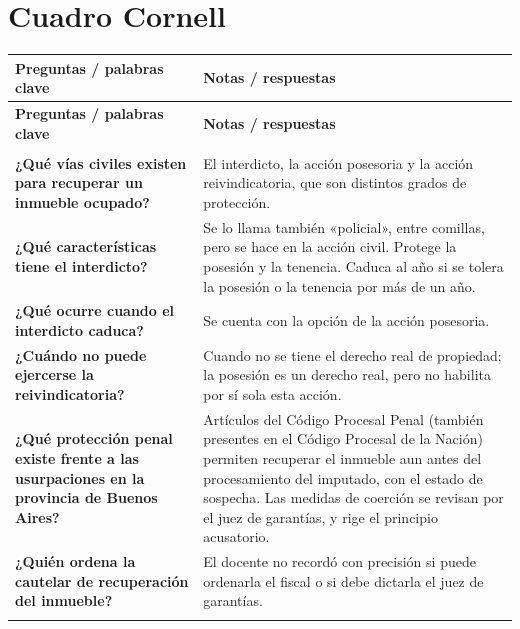 \documentclass[12pt,oneside]{book}
\newlength{\cornellizq}
\newlength{\cornellder}
\newenvironment{cornell}
{\begin{longtable}{>{\columncolor{gray!10}\raggedright\arraybackslash}p{\cornellizq}>{\raggedright\arraybackslash}p{\cornellder}}
\toprule
\textbf{Preguntas / palabras clave} & \textbf{Notas / respuestas} \\
\midrule
\endfirsthead
\toprule
\textbf{Preguntas / palabras clave} & \textbf{Notas / respuestas} \\
\midrule
\endhead
\midrule
\multicolumn{2}{r}{\footnotesize\itshape Continúa en la página siguiente} \\
\endfoot
\endlastfoot}
{\end{longtable}}
\begin{document}
\section{Cuadro Cornell}

\begin{cornell}
\textbf{¿Qué vías civiles existen para recuperar un inmueble ocupado?} &
El interdicto, la acción posesoria y la acción reivindicatoria, que son distintos grados de protección. \\
\addlinespace
\midrule[0.3pt]
\textbf{¿Qué características tiene el interdicto?} &
Se lo llama también «policial», entre comillas, pero se hace en la acción civil. Protege la posesión y la tenencia. Caduca al año si se tolera la posesión o la tenencia por más de un año. \\
\addlinespace
\midrule[0.3pt]
\textbf{¿Qué ocurre cuando el interdicto caduca?} &
Se cuenta con la opción de la acción posesoria. \\
\addlinespace
\midrule[0.3pt]
\textbf{¿Cuándo no puede ejercerse la reivindicatoria?} &
Cuando no se tiene el derecho real de propiedad; la posesión es un derecho real, pero no habilita por sí sola esta acción. \\
\addlinespace
\midrule[0.3pt]
\textbf{¿Qué protección penal existe frente a las usurpaciones en la provincia de Buenos Aires?} &
Artículos del Código Procesal Penal (también presentes en el Código Procesal de la Nación) permiten recuperar el inmueble aun antes del procesamiento del imputado, con el estado de sospecha. Las medidas de coerción se revisan por el juez de garantías, y rige el principio acusatorio. \\
\addlinespace
\midrule[0.3pt]
\textbf{¿Quién ordena la cautelar de recuperación del inmueble?} &
El docente no recordó con precisión si puede ordenarla el fiscal o si debe dictarla el juez de garantías. \\
\addlinespace
\midrule
\rowcolor{blue!5}
\multicolumn{2}{>{\raggedright\arraybackslash}p{\dimexpr\cornellizq+\cornellder+2\tabcolsep\relax}}{%
\textbf{Resumen.} Para recuperar un inmueble ocupado existen tres grados de protección civil: interdicto (caduca al año), acción posesoria y reivindicatoria (requiere derecho real de propiedad). A ello se suma la protección penal en usurpaciones, que en la provincia de Buenos Aires permite recuperar el inmueble aun antes del procesamiento del imputado, y que hoy está más aceptada que antes.} \\
\bottomrule
\end{cornell}
\end{document}

